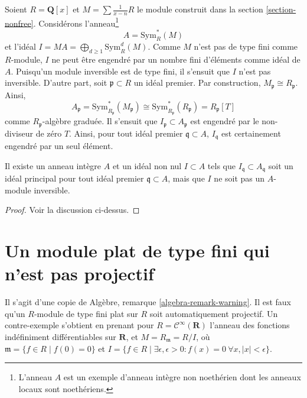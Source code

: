 \medskip\noindent
Soient $R = \mathbf{Q}[x]$ et $M = \sum \frac{1}{x - n}R$
le module construit dans la section \ref{section-nonfree}.
Considérons l'anneau\footnote{L'anneau $A$ est un exemple
d'anneau intègre non noethérien dont les anneaux locaux sont noethériens.}
$$
A = \text{Sym}^*_R(M)
$$
et l'idéal $I = M A = \bigoplus_{d \geq 1} \text{Sym}^d_R(M)$.
Comme $M$ n'est pas de type fini comme $R$-module,
$I$ ne peut être engendré par un nombre fini d'éléments comme idéal de $A$.
Puisqu'un module inversible est de type fini, il s'ensuit que
$I$ n'est pas inversible.
D'autre part, soit $\mathfrak p \subset R$ un idéal premier.
Par construction, $M_\mathfrak p \cong R_\mathfrak p$. Ainsi,
$$
A_\mathfrak p = \text{Sym}^*_{R_\mathfrak p}(M_\mathfrak p) \cong
\text{Sym}^*_{R_\mathfrak p}(R_\mathfrak p) =
R_\mathfrak p[T]
$$
comme $R_\mathfrak p$-algèbre graduée. Il s'ensuit que
$I_\mathfrak p \subset A_\mathfrak p$ est engendré par
le non-diviseur de zéro $T$.
Ainsi, pour tout idéal premier $\mathfrak q \subset A$,
$I_\mathfrak q$ est certainement engendré par un seul élément.

\begin{lemma}
\label{lemma-locally-principal-not-invertible}
Il existe un anneau intègre $A$ et un idéal non nul $I \subset A$
tels que $I_\mathfrak q \subset A_\mathfrak q$ soit un idéal
principal pour tout idéal premier $\mathfrak q \subset A$, mais que $I$ ne soit pas un
$A$-module inversible.
\end{lemma}

\begin{proof}
Voir la discussion ci-dessus.
\end{proof}









\section{Un module plat de type fini qui n'est pas projectif}
\label{section-finite-flat-not-projective}

\noindent
Il s'agit d'une copie de
Algèbre, remarque \ref{algebra-remark-warning}.
Il est faux qu'un $R$-module de type fini
plat sur $R$ soit automatiquement projectif. Un contre-exemple
s'obtient en prenant pour $R = \mathcal{C}^\infty(\mathbf{R})$
l'anneau des fonctions indéfiniment différentiables sur
$\mathbf{R}$, et $M = R_{\mathfrak m} = R/I$, où
$\mathfrak m = \{f \in R \mid f(0) = 0\}$ et
$I = \{f \in R \mid \exists \epsilon, \epsilon > 0 :
f(x) = 0\ \forall x, |x| < \epsilon\}$.

